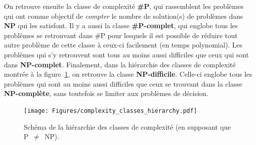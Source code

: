 On retrouve ensuite la classe de complexité \textbf{\#P}, qui rassemblent les problèmes qui ont comme objectif de \emph{compter} le nombre de solution(s) de problèmes dans \textbf{NP} qui les satisfont.
Il y a aussi la classe \textbf{\#P-complet}, qui englobe tous les problèmes se retrouvant dans \#P pour lesquels il est possible de réduire tout autre problème de cette classe à ceux-ci facilement (en temps polynomial).
Les problèmes qui s'y retrouvent sont tous au moins aussi difficiles que ceux qui sont dans \textbf{NP-complet}.
Finalement, dans la hiérarchie des classes de complexité montrée à la figure~\ref{fig:complexites}, on retrouve la classe \textbf{NP-difficile}. 
Celle-ci englobe tous les problèmes qui sont au moins aussi difficiles que ceux se trouvant dans la classe \textbf{NP-complète}, sans toutefois se limiter aux problèmes de décision.
\begin{figure}[h]
    \centering
    \texttt{[image: Figures/complexity\_classes\_hierarchy.pdf]}
    \caption[Schéma de la hiérarchie des classes de complexité.]{Schéma de la hiérarchie des classes de complexité (en supposant que P~$\ne$~NP).}
    \label{fig:complexites}
\end{figure}



